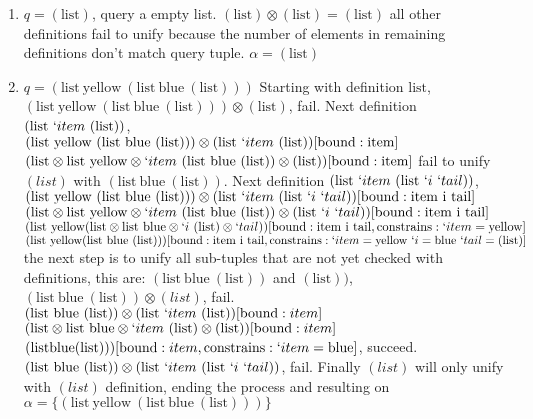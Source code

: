 \documentclass[11pt,a4paper]{report}
\newcommand{\var}[1]{`#1}
\newcommand{\unify}{\otimes}
\begin{document}
\begin{enumerate}
\item $q = (\text{list})$, query a empty list.
\subitem $(\text{list}) \unify (\text{list}) = (\text{list})$
\subitem all other definitions fail to unify because the number of elements in remaining definitions don't match query tuple.
\subitem $\alpha = {(\text{list})}$
\item $q = (\text{list}\ \text{yellow}\ (\text{list}\ \text{blue}\ (\text{list})))$
\subitem Starting with definition $\text{list}$,
\subitem $(\text{list}\ \text{yellow}\ (\text{list}\ \text{blue}\ (\text{list}))) \unify (\text{list})$, fail.
\subitem Next definition $(\text{list}\ \var{item}\ (\text{list}))$,
\subitem $(\text{list}\ \text{yellow}\ (\text{list}\ \text{blue}\ (\text{list}))) \unify (\text{list}\ \var{item}\ (\text{list}))[\text{bound}: \text{item} ]$
\subitem $(\text{list} \unify \text{list}\ \text{yellow} \unify \var{item}\ (\text{list}\ \text{blue}\ (\text{list})) \unify (\text{list}))[\text{bound}: \text{item}]$
\subitem fail to unify $(list)$ with $(\text{list}\ \text{blue}\ (\text{list}))$.
\subitem Next definition $(\text{list}\ \var{item}\ (\text{list}\ \var{i}\ \var{tail}))$,
\subitem $(\text{list}\ \text{yellow}\ (\text{list}\ \text{blue}\ (\text{list}))) \unify (\text{list}\ \var{item}\ (\text{list}\ \var{i}\ \var{tail}))[\text{bound}: \text{item}\ \text{i}\ \text{tail}]$
\subitem $(\text{list}\unify \text{list}\ \text{yellow} \unify \var{item}\ (\text{list}\ \text{blue}\ (\text{list})) \unify (\text{list}\ \var{i}\ \var{tail}))[\text{bound}: \text{item}\ \text{i}\ \text{tail}]$
\subitem $(\text{list}\ \text{yellow} (\text{list}\unify \text{list}\ \text{blue} \unify \var{i}\ (\text{list}) \unify \var{tail}))[\text{bound}: \text{item}\ \text{i}\ \text{tail}, \text{constrains}: \var{item} = \text{yellow}]$
\subitem $(\text{list}\ \text{yellow} (\text{list}\ \text{blue}\ (\text{list})))
[\text{bound}: \text{item}\ \text{i}\ \text{tail}, \text{constrains}: \var{item} = \text{yellow}\ \var{i}=\text{blue}\ \var{tail}=(\text{list})]$
\subitem the next step is to unify all sub-tuples that are not yet checked with definitions, this are: $(\text{list}\ \text{blue}\ (\text{list}))$ and $(\text{list}))$,
\subitem $(\text{list}\ \text{blue}\ (\text{list})) \unify (list)$, fail.
\subitem $(\text{list}\ \text{blue}\ (\text{list})) \unify (\text{list}\ \var{item}\ (\text{list}))[\text{bound}: item]$
\subitem $(\text{list}\unify \text{list}\ \text{blue}\unify \var{item}\ (\text{list}) \unify (\text{list}))[\text{bound}: item]$
\subitem $(\text{list} \text{blue} (\text{list})))[\text{bound}: item, \text{constrains}: \var{item}=\text{blue}]$, succeed.
\subitem $(\text{list}\ \text{blue}\ (\text{list})) \unify (\text{list}\ \var{item}\ (\text{list}\ \var{i}\ \var{tail}))$, fail.
\subitem Finally $(list)$ will only unify with $(list)$ definition, ending the process and resulting on $\alpha = \{ (\text{list}\ \text{yellow}\ (\text{list}\ \text{blue}\ (\text{list}))) \}$
\end{enumerate}
\end{document}
